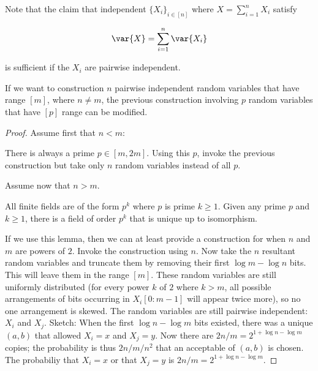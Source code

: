 \documentclass[../main.tex]{subfiles}
\begin{document}
\begin{remark}
    Note that the claim that independent $\{X_{i}\}_{i \in [n]}$ where $X = \sum_{i=1}^{n}X_{i}$ satisfy

    \[
        \var{X} = \sum_{i=1}^{n}\var{X_{i}}
    \]

    is sufficient if the $X_{i}$ are pairwise independent.
\end{remark}

\begin{proposition}
    If we want to construction $n$ pairwise independent random variables that have range $[m]$, where $n \not = m$, the previous construction involving $p$ random variables that have $[p]$ range can be modified.
\end{proposition}

\begin{proof}
    Assume first that $n < m$:

    There is always a prime $p \in [m, 2m]$. Using this $p$, invoke
    the previous construction but take only $n$ random variables 
    instead of all $p$.

    Assume now that $n > m$. 

    \begin{lemma}
        All finite fields are of the form $p^k$ where $p$ is prime $k \geq 1$. Given any prime $p$ and $k \geq 1$, there is a field of order $p^k$ that is unique up to isomorphism.
    \end{lemma}

    If we use this lemma, then we can at least provide a construction
    for when $n$ and $m$ are powers of $2$. Invoke the construction
    using $n$. Now take the $n$ resultant random variables and truncate them by removing their first $\log m - \log n$ bits. This will leave
    them in the range $[m]$. These random variables are still
    uniformly distributed (for every power $k$ of $2$ where $k > m$, all possible arrangements of bits occurring in $X_{i}[0:m-1]$ will appear twice more), so no one arrangement is skewed. The random variables are still pairwise independent: $X_{i}$ and $X_{j}$. Sketch: When the first $\log n - \log m$ bits existed, there was a unique $(a,b)$ that allowed $X_{i} = x$ and $X_{j} = y$. Now there are $2n/m = 2^{1 + \log n - \log m}$ copies; the probability is thus $2n/m \bigg/ n^2$ that an acceptable of $(a,b)$ is chosen. The probabiliy that $X_{i} = x$ or that $X_{j} = y$ is $2n/m = 2^{1 + \log n - \log m}$.
\end{proof}
\end{document}
